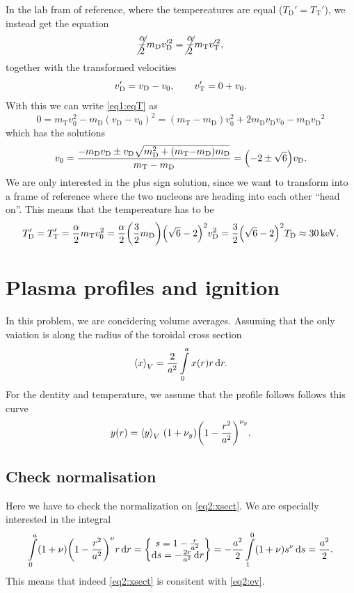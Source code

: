 \documentclass[11pt,a4paper, 
swedish, english %
]{article}
\newcommand{\mH}{\ensuremath{m_{\text{H}}}}
\newcommand{\vD}{\ensuremath{v_{\text{D}}}}
\newcommand{\TD}{\ensuremath{T_{\text{D}}}}
\newcommand{\mD}{\ensuremath{m_{\text{D}}}}
\newcommand{\vT}{\ensuremath{v_{\text{T}}}}
\newcommand{\TT}{\ensuremath{T_{\text{T}}}}
\newcommand{\mT}{\ensuremath{m_{\text{T}}}}
\begin{document}
In the lab fram of reference, where the tempereatures are equal
($\TD'=\TT'$), we instead get the equation
\begin{equation}\label{eq1:eqT}
\cancel{\frac{\alpha}{2}}\mD\vD'^2=\cancel{\frac{\alpha}{2}}\mT\vT'^2,
\end{equation}
together with the transformed velocities
\begin{equation}
\vD'=\vD-v_0\qc\quad\vT'=0+v_0.
\end{equation}
With this we can write \eqref{eq1:eqT} as
\begin{equation}
0=\mT v_0^2-\mD(\vD-v_0)^2
=(\mT-\mD)v_0^2 +2\mD\vD v_0 - \mD\vD^2
\end{equation}
which has the solutions
\begin{equation}
v_0=\frac{-\mD\vD\pm
\vD\sqrt{\mD^2+(\mT{-}\mD)\mD}
}{\mT-\mD}
=\qty(-2\pm\sqrt{6})\vD.
\end{equation}
We are only interested in the plus sign solution, since we want to
transform into a frame of reference where the two nucleons are heading
into each other ``head on''. This means that the tempereature has to
be
\begin{equation}
\TD'=\TT'=\frac{\alpha}{2}\mT v_0^2
=\frac{\alpha}{2}\qty(\frac{3}{2}\mD)\qty(\sqrt6-2)^2\vD^2
=\frac{3}{2}\qty(\sqrt6-2)^2 \TD
\approx\unit[30]{keV}.
\end{equation}






\section{Plasma profiles and ignition}
In this problem, we are concidering volume averages. Assuming that
the only vaiation is along the radius of the toroidal cross section
\begin{equation}\label{eq2:ev}
\ev{x}_V=\frac{2}{a^2}\int_0^a x(r)r\id{r}.
\end{equation}
For the dentity and temperature, we assume that the profile follows
follows this curve
\begin{equation}\label{eq2:xsect}
y(r)=\ev{y}_V\, (1+\nu_y)\qty(1-\frac{r^2}{a^2})^{\nu_y}.
\end{equation}

\subsection*{Check normalisation}
Here we have to check the normalization on \eqref{eq2:xsect}. We are
especially interested in the integral
\begin{equation}\label{eq2:norm}
\int_0^a(1+\nu)\qty(1-\frac{r^2}{a^2})^{\nu}r\id{r}=
\begin{Bmatrix}
  s=1-\frac{r}{a^2}\\
  \rd{s}=-\frac{2r}{a^2}\id{r}
\end{Bmatrix}
=-\frac{a^2}{2} \int_1^0(1+\nu)s^{\nu}\id{s}
=\frac{a^2}{2}.
\end{equation}
This means that indeed \eqref{eq2:xsect} is consitent with \eqref{eq2:ev}.
\end{document}
